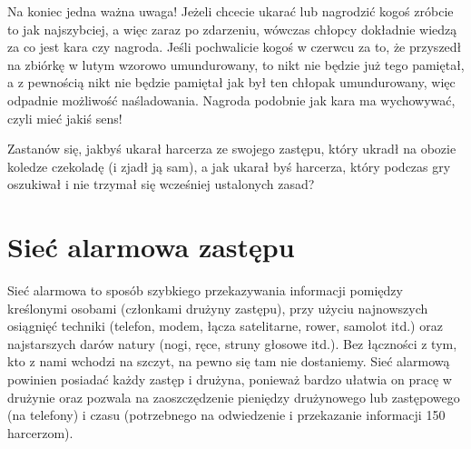 Na koniec jedna ważna uwaga! Jeżeli chcecie ukarać lub nagrodzić kogoś zróbcie to jak najszybciej, a więc zaraz po zdarzeniu, wówczas chłopcy dokładnie wiedzą za co jest kara czy nagroda. Jeśli pochwalicie kogoś w czerwcu za to, że przyszedł na zbiórkę w lutym wzorowo umundurowany, to nikt nie będzie już  tego pamiętał, a z pewnością nikt nie będzie pamiętał jak był ten chłopak umundurowany, więc odpadnie możliwość naśladowania. Nagroda podobnie jak kara ma wychowywać, czyli mieć jakiś sens!

Zastanów się, jakbyś ukarał harcerza ze swojego zastępu, który ukradł na obozie  koledze czekoladę (i zjadł  ją sam), a jak ukarał byś harcerza, który podczas gry  oszukiwał i nie trzymał się wcześniej ustalonych zasad?



\section{Sieć alarmowa zastępu}
Sieć alarmowa to sposób szybkiego przekazywania informacji pomiędzy kreślonymi osobami (członkami drużyny zastępu), przy użyciu najnowszych osiągnięć techniki (telefon, modem, łącza satelitarne, rower, samolot  itd.) oraz najstarszych darów natury (nogi, ręce, struny głosowe itd.). Bez łączności z tym, kto z nami wchodzi na szczyt, na pewno się tam nie dostaniemy. Sieć alarmową powinien posiadać każdy zastęp i drużyna, ponieważ bardzo ułatwia on pracę w drużynie oraz pozwala na zaoszczędzenie pieniędzy drużynowego lub zastępowego (na  telefony)  i czasu (potrzebnego na odwiedzenie i przekazanie informacji 150 harcerzom).